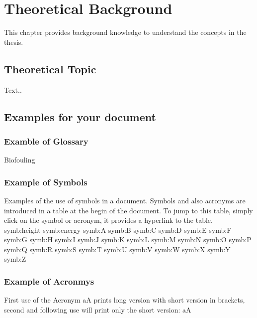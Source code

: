 \documentclass[class=scrbook, crop=false]{standalone}
\begin{document}
\ifstandalone

    
\fi

\chapter{Theoretical Background}
\label{Chapter::Theoretical_Background} %
This chapter provides background knowledge to understand the concepts in the thesis.

\section{Theoretical Topic}
\label{Section::Theoretical_Topic}
    Text..

\section{Examples for your document}
    
    \subsection{Examble of Glossary}
    \gls{Biofouling}
    
    \subsection{Example of Symbols}
    Examples of the use of symbols in a document. Symbols and also acronyms are introduced in a table at the begin of the document. To jump to this table, simply click on the symbol or acronym, it provides a hyperlink to the table.\\
    \gls{symb:height}
    \gls{symb:energy}
    \gls{symb:A}
    \gls{symb:B}
    \gls{symb:C}
    \gls{symb:D}
    \gls{symb:E}
    \gls{symb:F}
    \gls{symb:G}
    \gls{symb:H}
    \gls{symb:I}
    \gls{symb:J}
    \gls{symb:K}
    \gls{symb:L}
    \gls{symb:M}
    \gls{symb:N}
    \gls{symb:O}
    \gls{symb:P}
    \gls{symb:Q}
    \gls{symb:R}
    \gls{symb:S}
    \gls{symb:T}
    \gls{symb:U}
    \gls{symb:V}
    \gls{symb:W}
    \gls{symb:X}
    \gls{symb:Y}
    \gls{symb:Z}
    
    \subsection{Example of Acronmys}
    First use of the Acronym \gls{aA} prints long version with short version in brackets, second and following use will print only the short version: \gls{aA}
    
\end{document}
